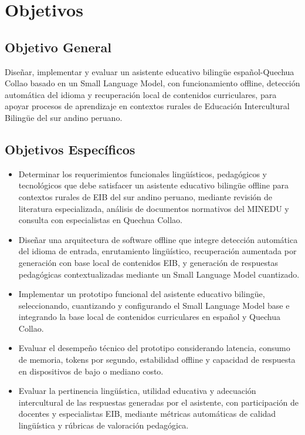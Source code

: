 
\section{Objetivos}
\subsection{Objetivo General}
Diseñar, implementar y evaluar un asistente educativo bilingüe español-Quechua Collao basado en un Small Language Model, con funcionamiento offline, detección automática del idioma y recuperación local de contenidos curriculares, para apoyar procesos de aprendizaje en contextos rurales de Educación Intercultural Bilingüe del sur andino peruano.

\subsection{Objetivos Específicos}
\begin{itemize}
	\item Determinar los requerimientos funcionales lingüísticos, pedagógicos y tecnológicos que debe satisfacer un asistente educativo bilingüe offline para contextos rurales de EIB del sur andino peruano, mediante revisión de literatura especializada, análisis de documentos normativos del MINEDU y consulta con especialistas en Quechua Collao.
	\item Diseñar una arquitectura de software offline que integre detección automática del idioma de entrada, enrutamiento lingüístico, recuperación aumentada por generación con base local de contenidos EIB, y generación de respuestas pedagógicas contextualizadas mediante un Small Language Model cuantizado.
	\item Implementar un prototipo funcional del asistente educativo bilingüe, seleccionando, cuantizando y configurando el Small Language Model base e integrando la base local de contenidos curriculares en español y Quechua Collao.
	\item Evaluar el desempeño técnico del prototipo considerando latencia, consumo de memoria, tokens por segundo, estabilidad offline y capacidad de respuesta en dispositivos de bajo o mediano costo.
	\item Evaluar la pertinencia lingüística, utilidad educativa y adecuación intercultural de las respuestas generadas por el asistente, con participación de docentes y especialistas EIB, mediante métricas automáticas de calidad lingüística y rúbricas de valoración pedagógica.
\end{itemize}

